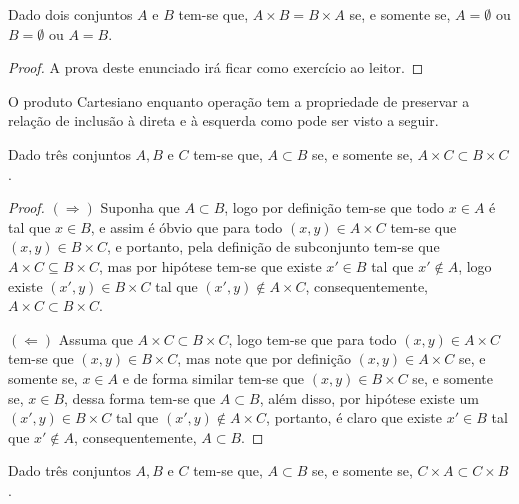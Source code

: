 \begin{theorem}\label{teo:IgualdadeCartesiano}
	Dado dois conjuntos $A$ e $B$ tem-se que, $A \times B = B \times A$ se, e somente se, $A = \emptyset$ ou $B = \emptyset$ ou $A = B$.
\end{theorem}

\begin{proof}
	A prova deste enunciado irá ficar como exercício ao leitor.
\end{proof}

O produto Cartesiano enquanto operação tem a propriedade de preservar a relação de inclusão à direta e à esquerda como pode ser visto a seguir.

\begin{theorem}\label{teo:CartesianoMonoDireita}
	Dado três conjuntos $A, B$ e $C$ tem-se que, $A \subset B$ se, e somente se, $A \times C \subset B \times C$.
\end{theorem}

\begin{proof}
	$(\Rightarrow)$ Suponha que $A \subset B$, logo por definição tem-se que todo $x \in A$ é tal que $x \in B$, e assim é óbvio que para todo $(x,y) \in A \times C$ tem-se que $(x, y) \in B \times C$, e portanto, pela definição de subconjunto tem-se que $A \times C \subseteq B \times C$, mas por hipótese tem-se que existe $x' \in B$ tal que $x' \notin A$, logo existe $(x', y) \in B \times C$ tal que $(x', y) \notin A \times C$, consequentemente, $A \times C \subset B \times C$.
	
	$(\Leftarrow)$ Assuma que $A \times C \subset B \times C$, logo tem-se que para todo $(x, y) \in A \times C$ tem-se que $(x, y) \in B \times C$, mas note que por definição $(x, y) \in A \times C$ se, e somente se, $x \in A$ e de forma similar tem-se que $(x, y) \in B \times C$ se, e somente se, $x \in B$, dessa forma tem-se que $A \subset B$, além disso, por hipótese existe um $(x', y) \in B \times C$ tal que $(x', y) \notin A \times C$, portanto, é claro que existe $x' \in B$ tal que $x' \notin A$, consequentemente, $A \subset B$.
\end{proof}

\begin{theorem}
	Dado três conjuntos $A, B$ e $C$ tem-se que, $A \subset B$ se, e somente se, $C \times A \subset C \times B$.
\end{theorem}

